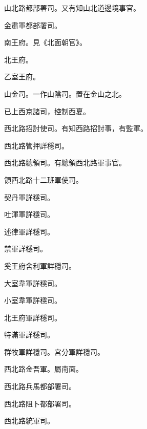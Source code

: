 \begin{pinyinscope}
 山北路都部署司。又有知山北道邊境事官。



 金肅軍都部署司。



 南王府。見《北面朝官》。



 北王府。



 乙室王府。



 山金司。一作山陰司。置在金山之北。



 已上西京諸司，控制西夏。



 西北路招討使司。有知西路招討事，有監軍。



 西北路管押詳穩司。



 西北路總領司。有總領西北路軍事官。



 領西北路十二班軍使司。



 契丹軍詳穩司。



 吐渾軍詳穩司。



 述律軍詳穩司。



 禁軍詳穩司。



 奚王府舍利軍詳穩司。



 大室韋軍詳穩司。



 小室韋軍詳穩司。



 北王府軍詳穩司。



 特滿軍詳穩司。



 群牧軍詳穩司。宮分軍詳穩司。



 西北路金吾軍。屬南面。



 西北路兵馬都部署司。



 西北路阻卜都部署司。



 西北路統軍司。




\end{pinyinscope}
